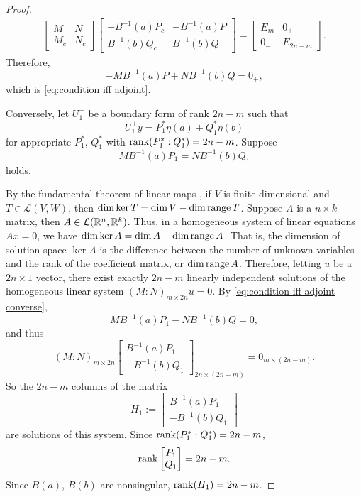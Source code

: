 \documentclass[11pt, oneside, a4paper]{article}
\begin{document}
\begin{proof}
    \begin{align*}
        \begin{bmatrix}
            M & N\\
            M_c & N_c
        \end{bmatrix}
        \begin{bmatrix}
            -B^{-1}(a)P_c & -B^{-1}(a)P\\
            B^{-1}(b)Q_c & B^{-1}(b)Q
        \end{bmatrix}
        =
        \begin{bmatrix}
            E_m & 0_+\\
            0_- & E_{2n-m}
        \end{bmatrix}.
    \end{align*}
    Therefore,
    \[-MB^{-1}(a)P + NB^{-1}(b)Q = 0_+,\]
    which is \eqref{eq:condition iff adjoint}.

    Conversely, let $U_1^+$ be a boundary form of rank $2n-m$ such that
    \[U_1^+y = P_1^*\eta(a) + Q_1^*\eta(b)\]
    for appropriate $P_1^*$, $Q_1^*$ with $\operatorname{rank}(P_1^*:Q_1^*)=2n-m$. Suppose
    \begin{equation}\label{eq:condition iff adjoint converse}
        MB^{-1}(a)P_1 = NB^{-1}(b)Q_1
    \end{equation}
    holds.

    By the fundamental theorem of linear maps \cite[p.63]{Axler1997}, if $V$ is finite-dimensional and $T\in\mathcal{L}(V, W)$, then $\dim\ker T = \dim V - \dim \operatorname{range} T$. Suppose $A$ is a $n\times k$ matrix, then $A\in\mathcal{L}(\mathbb R^n, \mathbb R^k)$. Thus, in a homogeneous system of linear equations $Ax=0$, we have $\dim \ker A = \dim A - \dim \operatorname{range} A$. That is, the dimension of solution space $\ker A$ is the difference between the number of unknown variables and the rank of the coefficient matrix, or $\dim\operatorname{range} A$. Therefore, letting $u$ be a $2n\times 1$ vector, there exist exactly $2n-m$ linearly independent solutions of the homogeneous linear system $(M:N)_{m\times 2n}u=0$. By \eqref{eq:condition iff adjoint converse},
    \[MB^{-1}(a)P_1 - NB^{-1}(b)Q=0,\]
    and thus
    \[(M:N)_{m\times 2n}\begin{bmatrix}
        B^{-1}(a)P_1\\
        -B^{-1}(b)Q_1
    \end{bmatrix}_{2n\times (2n-m)} = 0_{m\times (2n-m)}.\]
    So the $2n-m$ columns of the matrix
    \[H_1:= \begin{bmatrix}
        B^{-1}(a)P_1\\
        -B^{-1}(b)Q_1
    \end{bmatrix}\]
    are solutions of this system. Since $\operatorname{rank}(P_1^*:Q_1^*)=2n-m$,
    \[\operatorname{rank}\begin{bmatrix}P_1\\ Q_1\end{bmatrix}=2n-m.\]
    Since $B(a)$, $B(b)$ are nonsingular, $\operatorname{rank}(H_1)=2n-m$.


\end{proof}
\end{document}
